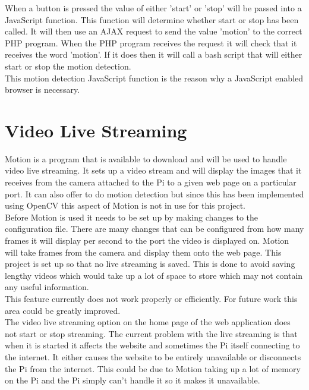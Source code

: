 \documentclass[]{report}
\begin{document}
When a button is pressed the value of either 'start' or 'stop' will be passed into a JavaScript function. This function will determine whether start or stop has been called. It will then use an AJAX request to send the value 'motion' to the correct PHP program. When the PHP program receives the request it will check that it receives the word 'motion'. If it does then it will call a bash script that will either start or stop the motion detection.\\

This motion detection JavaScript function is the reason why a JavaScript enabled browser is necessary.\\


\section{Video Live Streaming}
\label{sec:video}

Motion is a program that is available to download and will be used to handle video live streaming. It sets up a video stream and will display the images that it receives from the camera attached to the Pi to a given web page on a particular port. It can also offer to do motion detection but since this has been implemented using OpenCV this aspect of Motion is not in use for this project.\\

Before Motion is used it needs to be set up by making changes to the configuration file. There are many changes that can be configured from how many frames it will display per second to the port the video is displayed on. Motion will take frames from the camera and display them onto the web page. This project is set up so that no live streaming is saved. This is done to avoid saving lengthy videos which would take up a lot of space to store which may not contain any useful information.\\

This feature currently does not work properly or efficiently. For future work this area could be greatly improved.\\

The video live streaming option on the home page of the web application does not start or stop streaming. The current problem with the live streaming is that when it is started it affects the website and sometimes the Pi itself connecting to the internet. It either causes the website to be entirely unavailable or disconnects the Pi from the internet. This could be due to Motion taking up a lot of memory on the Pi and the Pi simply can't handle it so it makes it unavailable. \\
\end{document}
